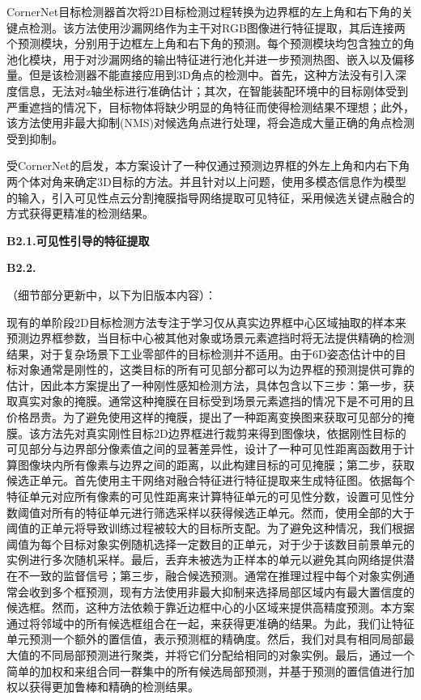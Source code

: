 \documentclass[12pt]{article}
\begin{document}
CornerNet目标检测器首次将2D目标检测过程转换为边界框的左上角和右下角的关键点检测。该方法使用沙漏网络作为主干对RGB图像进行特征提取，其后连接两个预测模块，分别用于边框左上角和右下角的预测。每个预测模块均包含独立的角池化模块，用于对沙漏网络的输出特征进行池化并进一步预测热图、嵌入以及偏移量。但是该检测器不能直接应用到3D角点的检测中。首先，这种方法没有引入深度信息，无法对z轴坐标进行准确估计；其次，在智能装配环境中的目标刚体受到严重遮挡的情况下，目标物体将缺少明显的角特征而使得检测结果不理想；此外，该方法使用非最大抑制(NMS)对候选角点进行处理，将会造成大量正确的角点检测受到抑制。

受CornerNet的启发，本方案设计了一种仅通过预测边界框的外左上角和内右下角两个体对角来确定3D目标的方法。并且针对以上问题，使用多模态信息作为模型的输入，引入可见性点云分割掩膜指导网络提取可见特征，采用候选关键点融合的方式获得更精准的检测结果。

\textbf{B2.1.可见性引导的特征提取}

\textbf{B2.2.}








（细节部分更新中，以下为旧版本内容）：

现有的单阶段2D目标检测方法专注于学习仅从真实边界框中心区域抽取的样本来预测边界框参数，当目标中心被其他对象或场景元素遮挡时将无法提供精确的检测结果，对于复杂场景下工业零部件的目标检测并不适用。由于6D姿态估计中的目标对象通常是刚性的，这类目标的所有可见部分都可以为边界框的预测提供可靠的估计，因此本方案提出了一种刚性感知检测方法，具体包含以下三步：第一步，获取真实对象的掩膜。通常这种掩膜在目标受到场景元素遮挡的情况下是不可用的且价格昂贵。为了避免使用这样的掩膜，提出了一种距离变换图来获取可见部分的掩膜。该方法先对真实刚性目标2D边界框进行裁剪来得到图像块，依据刚性目标的可见部分与边界部分像素值之间的显著差异性，设计了一种可见性距离函数用于计算图像块内所有像素与边界之间的距离，以此构建目标的可见掩膜；第二步，获取候选正单元。首先使用主干网络对融合特征进行特征提取来生成特征图。依据每个特征单元对应所有像素的可见性距离来计算特征单元的可见性分数，设置可见性分数阈值对所有的特征单元进行筛选采样以获得候选正单元。然而，使用全部的大于阈值的正单元将导致训练过程被较大的目标所支配。为了避免这种情况，我们根据阈值为每个目标对象实例随机选择一定数目的正单元，对于少于该数目前景单元的实例进行多次随机采样。最后，丢弃未被选为正样本的单元以避免其向网络提供潜在不一致的监督信号；第三步，融合候选预测。通常在推理过程中每个对象实例通常会收到多个框预测，现有方法使用非最大抑制来选择局部区域内有最大置信度的候选框。然而，这种方法依赖于靠近边框中心的小区域来提供高精度预测。本方案通过将邻域中的所有候选框组合在一起，来获得更准确的结果。为此，我们让特征单元预测一个额外的置信值，表示预测框的精确度。然后，我们对具有相同局部最大值的不同局部预测进行聚类，并将它们分配给相同的对象实例。最后，通过一个简单的加权和来组合同一群集中的所有候选局部预测，并基于预测的置信值进行加权以获得更加鲁棒和精确的检测结果。
\end{document}
